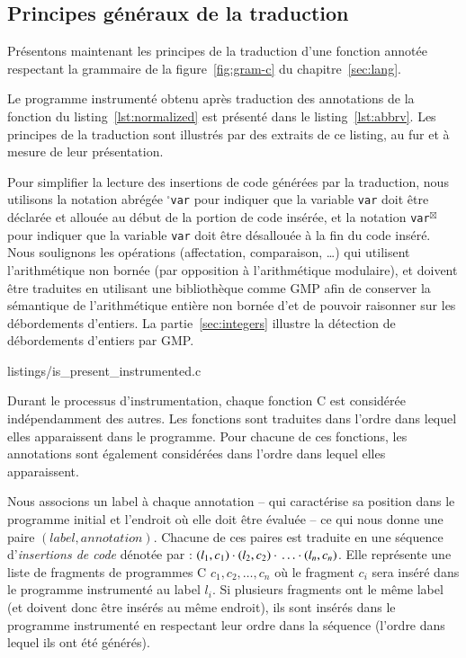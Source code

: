\subsection{Principes généraux de la traduction}
\label{sec:principles}


Présentons maintenant les principes de la traduction d'une fonction annotée
respectant la grammaire de la figure~\ref{fig:gram-c} du
chapitre~\ref{sec:lang}.

Le programme instrumenté obtenu après traduction des annotations de la fonction
du listing~\ref{lst:normalized} est présenté dans le listing~\ref{lst:abbrv}.
Les principes de la traduction sont illustrés par des extraits de ce listing,
au fur et à mesure de leur présentation.

Pour simplifier la lecture des insertions de code générées par la traduction,
nous utilisons la notation abrégée ${}^{\square}$\lstinline{var} pour indiquer
que la variable \lstinline{var} doit être déclarée et allouée
au début de la portion de code insérée, et la notation
\lstinline{var}${}^{\boxtimes}$ pour indiquer que la variable \lstinline{var} doit
être désallouée à la fin du code inséré.
Nous soulignons les opérations (affectation, comparaison, \dots) qui utilisent
l'arithmétique non bornée (par opposition à l'arithmétique modulaire), et
doivent être traduites en utilisant une bibliothèque comme GMP afin de conserver
la sémantique de l'arithmétique entière non bornée d'\eacsl et de pouvoir
raisonner sur les débordements d'entiers.
La partie~\ref{sec:integers} illustre la détection de débordements d'entiers par
GMP.



                {listings/is_present_instrumented.c}


Durant le processus d'instrumentation, chaque fonction C est considérée
indépendamment des autres.
Les fonctions sont traduites dans l'ordre dans lequel elles apparaissent dans le
programme.
Pour chacune de ces fonctions, les annotations \eacsl sont également considérées
dans l'ordre dans lequel elles apparaissent.

Nous associons un label à chaque annotation -- qui caractérise sa position dans
le programme initial et l'endroit où elle doit être évaluée -- ce qui nous
donne une paire $(label, annotation)$.
Chacune de ces paires est traduite en une séquence
d'\emph{insertions de code} dénotée par :
$(l_1, c_1) \cdot{} (l_2, c_2) \cdot{} \ldots \cdot{} (l_n, c_n)$.
Elle représente une liste de fragments de programmes C $c_1, c_2, \ldots, c_n$
où le fragment $c_i$ sera inséré dans le programme instrumenté au label $l_i$.
Si plusieurs fragments ont le même label (et doivent donc être insérés au
même endroit), ils sont insérés dans le programme instrumenté en respectant leur
ordre dans la séquence (l'ordre dans lequel ils ont été générés).

